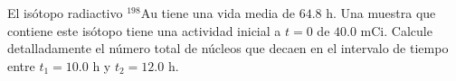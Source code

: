 \item El isótopo radiactivo $^{198}\text{Au}$ tiene una vida media de $64.8\text{ h}$. Una muestra que contiene este isótopo tiene una actividad inicial a $t = 0$ de $40.0\text{ mCi}$. Calcule detalladamente el número total de núcleos que decaen en el intervalo de tiempo entre $t_1 = 10.0\text{ h}$ y $t_2 = 12.0\text{ h}$.